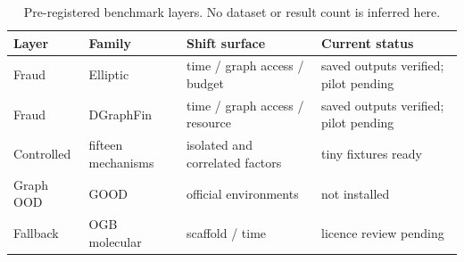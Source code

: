 \begin{table}[t]
\centering
\caption{Pre-registered benchmark layers. No dataset or result count is inferred here.}
\label{tab:datasets}
\small
\begin{tabular}{llll}
\toprule
Layer & Family & Shift surface & Current status \\
\midrule
Fraud & Elliptic & time / graph access / budget & saved outputs verified; pilot pending \\
Fraud & DGraphFin & time / graph access / resource & saved outputs verified; pilot pending \\
Controlled & fifteen mechanisms & isolated and correlated factors & tiny fixtures ready \\
Graph OOD & GOOD & official environments & not installed \\
Fallback & OGB molecular & scaffold / time & licence review pending \\
\bottomrule
\end{tabular}
\end{table}
